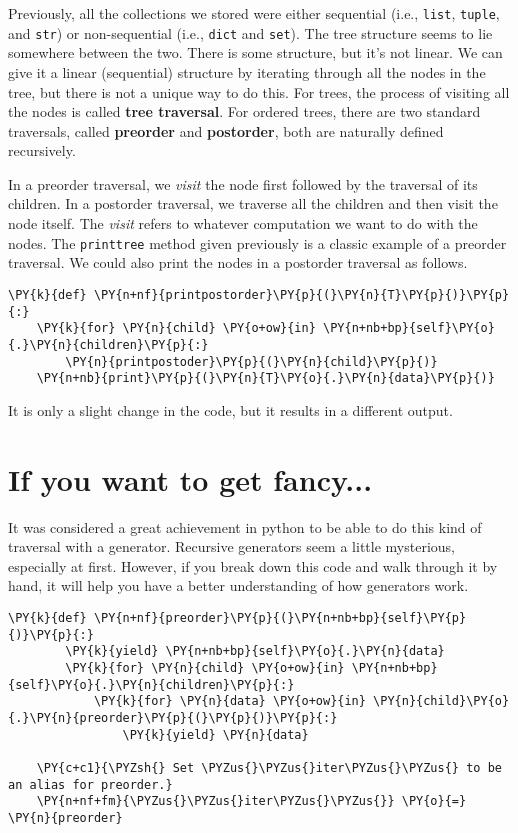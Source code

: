 Previously, all the collections we stored were either sequential (i.e., \texttt{list}, \texttt{tuple}, and \texttt{str}) or non-sequential (i.e., \texttt{dict} and \texttt{set}).  The tree structure seems to lie somewhere between the two.
There is some structure, but it's not linear.
We can give it a linear (sequential) structure by iterating through all the nodes in the tree, but there is not a unique way to do this.
For trees, the process of visiting all the nodes is called \textbf{tree traversal}.
For ordered trees, there are two standard traversals, called \textbf{preorder} and \textbf{postorder}, both are naturally defined recursively.


In a preorder traversal, we \emph{visit} the node first followed by the traversal of its children.
In a postorder traversal, we traverse all the children and then visit the node itself.
The \emph{visit} refers to whatever computation we want to do with the nodes.
The \texttt{printtree} method given previously is a classic example of a preorder traversal.
We could also print the nodes in a postorder traversal as follows.

\begin{Verbatim}[commandchars=\\\{\}]
\PY{k}{def} \PY{n+nf}{printpostorder}\PY{p}{(}\PY{n}{T}\PY{p}{)}\PY{p}{:}
    \PY{k}{for} \PY{n}{child} \PY{o+ow}{in} \PY{n+nb+bp}{self}\PY{o}{.}\PY{n}{children}\PY{p}{:}
        \PY{n}{printpostoder}\PY{p}{(}\PY{n}{child}\PY{p}{)}
    \PY{n+nb}{print}\PY{p}{(}\PY{n}{T}\PY{o}{.}\PY{n}{data}\PY{p}{)}
\end{Verbatim}



It is only a slight change in the code, but it results in a different output.

\section{If you want to get fancy...}


It was considered a great achievement in python to be able to do this kind of traversal with a generator.  Recursive generators seem a little mysterious, especially at first.  However, if you break down this code and walk through it by hand, it will help you have a better understanding of how generators work.

\begin{Verbatim}[commandchars=\\\{\}]
    \PY{k}{def} \PY{n+nf}{preorder}\PY{p}{(}\PY{n+nb+bp}{self}\PY{p}{)}\PY{p}{:}
        \PY{k}{yield} \PY{n+nb+bp}{self}\PY{o}{.}\PY{n}{data}
        \PY{k}{for} \PY{n}{child} \PY{o+ow}{in} \PY{n+nb+bp}{self}\PY{o}{.}\PY{n}{children}\PY{p}{:}
            \PY{k}{for} \PY{n}{data} \PY{o+ow}{in} \PY{n}{child}\PY{o}{.}\PY{n}{preorder}\PY{p}{(}\PY{p}{)}\PY{p}{:}
                \PY{k}{yield} \PY{n}{data}

    \PY{c+c1}{\PYZsh{} Set \PYZus{}\PYZus{}iter\PYZus{}\PYZus{} to be an alias for preorder.}
    \PY{n+nf+fm}{\PYZus{}\PYZus{}iter\PYZus{}\PYZus{}} \PY{o}{=} \PY{n}{preorder}
\end{Verbatim}



